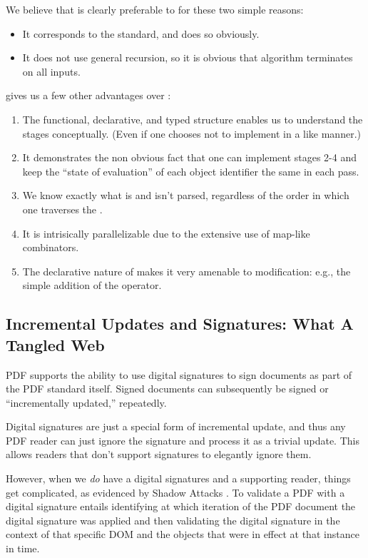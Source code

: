We believe that \ssp{} is clearly preferable to \dsp{} for these two
simple reasons:
\begin{itemize}
\item It corresponds to the standard, and does so obviously.
\item It does not use general recursion, so it is obvious that \ssp{}
  algorithm terminates on all inputs.
\end{itemize}
\ssp{} gives us a few other advantages over \dsp{}:
\begin{enumerate}
\item The functional, declarative, and typed structure enables
  us to understand the stages conceptually.  (Even if one chooses
  not to implement in a like manner.)
\item It demonstrates the non obvious fact that one can
  implement stages 2-4 and keep the ``state of evaluation'' of each
  object identifier the same in each pass.
\item We know exactly what is and isn't parsed, regardless of the
  order in which one traverses the .
\item It is intrisically parallelizable due to the extensive use of
  map-like combinators.
\item The declarative nature of \ssp{} makes it very amenable to
  modification: e.g., the simple addition of the 
  operator.
\end{enumerate}


\subsection{Incremental Updates and Signatures: What A Tangled Web}
\label{sec:updates-and-signatures}

PDF supports the ability to use digital signatures to sign documents
as part of the PDF standard itself.  Signed documents can
subsequently be signed or ``incrementally updated,'' repeatedly.

Digital signatures are just a special form of incremental update, and
thus any PDF reader can just ignore the signature and process it as a
trivial update.  This allows readers that don't support signatures to
elegantly ignore them.

However, when we \emph{do} have a digital signatures and a supporting
reader, things get complicated, as evidenced by Shadow Attacks
\cite{mladenovTrillionDollarRefund2019,ndsssymposiumNDSS2021Shadow2021}.
%
To validate a PDF with a digital signature entails identifying at
which iteration of the PDF document the digital signature was applied
and then validating the digital signature in the context of that
specific DOM and the objects that were in effect at that instance in
time.


